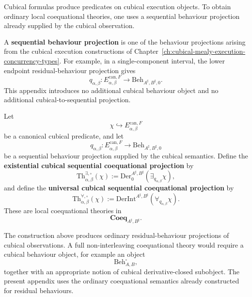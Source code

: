 Cubical formulas produce predicates on cubical execution objects.  To obtain
ordinary local coequational theories, one uses a sequential behaviour
projection already supplied by the cubical observation.

\begin{definition}
\label{def:sequential-behaviour-projection}
A \textbf{sequential behaviour projection} is one of the behaviour
projections arising from the cubical execution constructions of
Chapter~\ref{ch:cubical-mealy-execution-concurrency-types}.  For example,
in a single-component interval, the lower endpoint residual-behaviour
projection gives
\[
  q_{\alpha,\beta}:
  E^{\mathrm{can},F}_{\alpha,\beta}
  \longrightarrow
  \mathrm{Beh}_{A^\sharp,B^\sharp,0}.
\]
This appendix introduces no additional cubical behaviour object and no
additional cubical-to-sequential projection.
\end{definition}

\begin{definition}
\label{def:cubical-sequential-coequational-projections}
Let
\[
  \chi\hookrightarrow E^{\mathrm{can},F}_{\alpha,\beta}
\]
be a canonical cubical predicate, and let
\[
  q_{\alpha,\beta}:
  E^{\mathrm{can},F}_{\alpha,\beta}
  \to
  \mathrm{Beh}_{A^\sharp,B^\sharp,0}
\]
be a sequential behaviour projection supplied by the cubical semantics.
Define the \textbf{existential cubical sequential coequational projection} by
\[
  \mathrm{Th}^{\exists,\square}_{\alpha,\beta}(\chi)
  :=
  \mathrm{Der}^{A^\sharp,B^\sharp}_0
  \left(
    \exists_{q_{\alpha,\beta}}\chi
  \right),
\]
and define the \textbf{universal cubical sequential coequational projection}
by
\[
  \mathrm{Th}^{\forall,\square}_{\alpha,\beta}(\chi)
  :=
  \mathrm{DerInt}^{A^\sharp,B^\sharp}
  \left(
    \forall_{q_{\alpha,\beta}}\chi
  \right).
\]
These are local coequational theories in
\[
  \mathbf{Coeq}_{A^\sharp,B^\sharp}.
\]
\end{definition}

\begin{remark}
\label{rem:ordinary-rather-than-cubical-coequations}
The construction above produces ordinary residual-behaviour projections of
cubical observations.  A full non-interleaving coequational theory would
require a cubical behaviour object, for example an object
\[
  \mathrm{Beh}^{\square}_{A,B},
\]
together with an appropriate notion of cubical derivative-closed subobject.
The present appendix uses the ordinary coequational semantics already
constructed for residual behaviours.
\end{remark}

